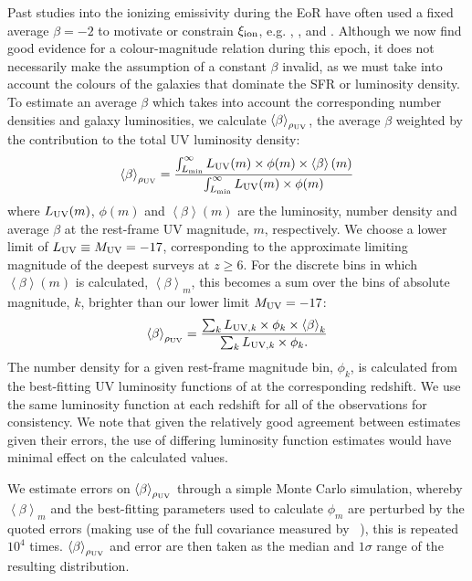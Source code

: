 Past studies into the ionizing emissivity during the EoR have often used a fixed average $\beta = -2$ to motivate or constrain $\xi_{\rm{ion}}$, e.g. \citet{Bolton:2007gc}, \citet{Ouchi:2009jd}, \citet{2010Natur.468...49R,Robertson:2013ji} and \citet{Kuhlen:2012ka}. Although we now find good evidence for a colour-magnitude relation during this epoch, it does not necessarily make the assumption of a constant $\beta$ invalid, as we must take into account the colours of the galaxies that dominate the SFR or luminosity density. To estimate an average $\beta$ which takes into account the corresponding number densities and galaxy luminosities, we calculate $\left \langle \beta  \right \rangle_{\rho_{\rm{UV}}}$, the average $\beta$ weighted by the contribution to the total UV luminosity density:
\begin{equation}
\left \langle \beta  \right \rangle_{\rho_{\rm{UV}}} = \frac{\int_{L_{\rm{min}}}^{\infty}  L_{\rm{UV}}(m) \times \phi(m) \times \left \langle \beta  \right \rangle (m)}{\int_{L_{\rm{min}}}^{\infty} L_{\rm{UV}}(m) \times \phi(m)}
\end{equation}
\noindent where $L_{\rm{UV}}(m)$, $\phi(m)$ and $\left \langle \beta  \right \rangle (m)$ are the luminosity, number density and average $\beta$ at the rest-frame UV magnitude, $m$, respectively. We choose a lower limit of $L_{\rm{UV}} \equiv M_{\rm{UV}} = -17$, corresponding to the approximate limiting magnitude of the deepest surveys at $z\geq6$. For the discrete bins in which $\left \langle \beta  \right \rangle (m)$ is calculated, $\left \langle \beta  \right \rangle_{m}$, this becomes a sum over the bins of absolute magnitude, $k$, brighter than our lower limit $M_{\rm{UV}} = -17$:
\begin{equation}
\left \langle \beta  \right \rangle_{\rho_{\rm{UV}}} = \frac{\sum_{k}^{ }  L_{\rm{UV}, \mathit{k}} \times \phi_{k} \times \left \langle \beta  \right \rangle_{k}}{\sum_{k}^{ } L_{\rm{UV},  \mathit{k}} \times \phi_{k}.}
\end{equation}
\noindent The number density for a given rest-frame magnitude bin, $\phi_{k}$, is calculated from the best-fitting UV luminosity functions of \citet{2015ApJ...803...34B} at the corresponding redshift. We use the same luminosity function at each redshift for all of the observations for consistency. We note that given the relatively good agreement between estimates given their errors, the use of differing luminosity function estimates would have minimal effect on the calculated values. 

We estimate errors on $\left \langle \beta  \right \rangle_{\rho_{\rm{UV}}}$ through a simple Monte Carlo simulation, whereby $\left \langle \beta  \right \rangle_{m}$ and the best-fitting \citet{Schechter:1976gl} parameters used to calculate $\phi_{m}$ are perturbed by the quoted errors (making use of the full covariance measured by \citeauthor{2015ApJ...803...34B}~\citeyear{2015ApJ...803...34B}), this is repeated $10^{4}$ times. $\left \langle \beta  \right \rangle_{\rho_{\rm{UV}}}$ and error are then taken as the median and $1\sigma$ range of the resulting distribution.

